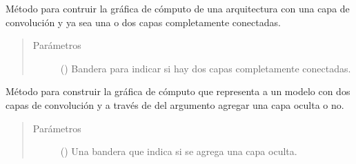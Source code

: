 \begin{fulllineitems}
\begin{fulllineitems}
\label{\detokenize{model_desc:cnn_indoor_classifier_model.CNNClassifierLAR.create_graph_1_convo_layer}}
Método para contruir la gráfica de cómputo de una arquitectura
con una capa de convolución y ya sea una o dos capas completamente
conectadas.
\begin{quote}\begin{description}
\item[{Parámetros}] \leavevmode
{} () \textendash{} Bandera para indicar si hay dos capas completamente conectadas.

\end{description}\end{quote}

\end{fulllineitems}


\begin{fulllineitems}
\label{\detokenize{model_desc:cnn_indoor_classifier_model.CNNClassifierLAR.create_graph_2_convo_layers}}
Método para construir la gráfica de cómputo que representa a un modelo
con dos capas de convolución y a través de del argumento agregar una capa
oculta o no.
\begin{quote}\begin{description}
\item[{Parámetros}] \leavevmode
{} () \textendash{} Una bandera que indica si se agrega una capa oculta.

\end{description}\end{quote}

\end{fulllineitems}



\end{fulllineitems}
